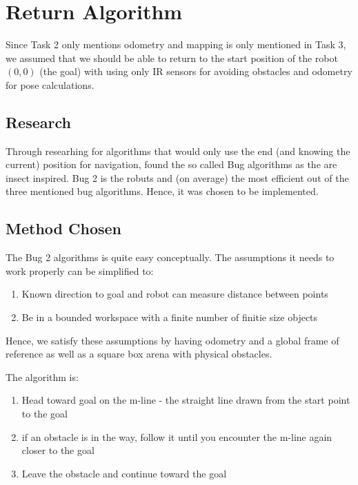 \documentclass[11pt, a4paper]{article}
\begin{document}
\newpage
\section{Return Algorithm}
\label{Return Algorithm}

Since Task 2 only mentions odometry and mapping is only mentioned in Task 3, we assumed that we should
be able to return to the start position of the robot ${(0,0)}$ (the goal) with using only IR sensors for avoiding obstacles
and odometry for pose calculations. 



\subsection{Research}

Through researhing for algorithms that would only use the end (and knowing the current) position for navigation, 
found the so called Bug algorithms as the are insect inspired. Bug 2 is the robuts and 
(on average) the most efficient out of the three mentioned bug algorithms. 
Hence, it was chosen to be implemented.




\subsection{Method Chosen}

The Bug 2 algorithms is quite easy conceptually. The assumptions it needs to work properly can be simplified to:

\begin{enumerate}

	\item Known direction to goal and robot can measure distance between points
	\item Be in a bounded workspace with a finite number of finitie size objects

\end{enumerate}

Hence, we satisfy these assumptions by having odometry and a global frame of reference as well 
as a square box arena with physical obstacles.

The algorithm is:

\begin{enumerate}

	\item Head toward goal on the m-line - the straight line drawn from the start point to the goal
	\item if an obstacle is in the way, follow it until you encounter the m-line again closer to the goal
	\item Leave the obstacle and continue toward the goal

\end{enumerate}
\end{document}
